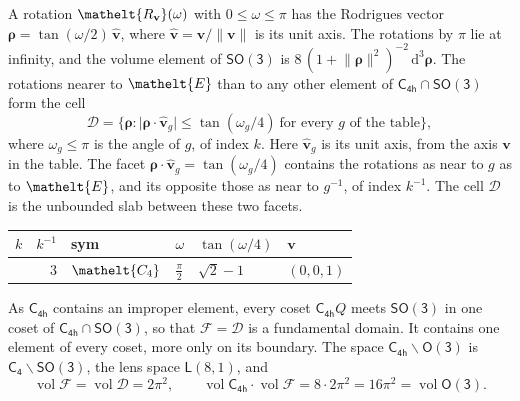 \documentclass[10pt,a4paper]{article}
\numberwithin{equation}{section}
\newcommand{\eltfont}[1]{{\let\sigma\eltsigma\mathelt{#1}}}
\newcommand{\grp}[1]{\mathsf{#1}}
\newcommand{\cls}[1]{\eltfont{#1}}
\newcommand{\elt}[1]{\eltfont{#1}}
\newcommand{\dirvec}[3]{(#1, #2, #3)}
\newcommand{\unitaxis}{\hat{\mathbf{v}}}
\newcommand{\vv}{\mathbf{v}}
\newcommand{\diff}{\mathrm{d}}
\newcommand{\vol}{\operatorname{vol}}
\newcommand{\rodrigues}{\boldsymbol{\rho}}
\newcommand{\fcell}{\mathcal{D}}
\newcommand{\fdomain}{\mathcal{F}}
\newcommand{\lensspace}[2]{\mathsf{L}(#1, #2)}
\begin{document}
\leavevmode\label{n:vector.rodrigues}\label{n:vector.unitaxis}A rotation $\elt{R_{\vv}}(\omega)$ with $0 \le \omega \le \pi$ has the Rodrigues vector $\rodrigues = \tan(\omega/2)\,\unitaxis$, where $\unitaxis = \vv/\lVert\vv\rVert$ is its unit axis. The rotations by $\pi$ lie at infinity, and the volume element of \href{SO3.pdf}{$\grp{SO(3)}$} is $8\,(1 + \lVert\rodrigues\rVert^2)^{-2}\,\diff^3\rodrigues$.
\leavevmode\label{n:set.cell}The rotations nearer to $\elt{E}$ than to any other element of $\grp{C_{4h}} \cap \grp{SO(3)}$ form the cell
\begin{equation}\label{e:cell}\fcell = \bigl\{\rodrigues : \lvert\rodrigues\cdot\unitaxis_g\rvert \le \tan(\omega_g/4)\ \text{for every $g$ of the table}\bigr\},\end{equation}
where $\omega_g \le \pi$ is the angle of $g$, of index $k$. Here $\unitaxis_g$ is its unit axis, from the axis $\vv$ in the table. The facet $\rodrigues\cdot\unitaxis_g = \tan(\omega_g/4)$ contains the rotations as near to $g$ as to $\elt{E}$, and its opposite those as near to $g^{-1}$, of index $k^{-1}$. The cell $\fcell$ is the unbounded slab between these two facets.
{\small{\renewcommand{\arraystretch}{1.3}\begin{longtable}{@{}rrllll@{}}\toprule
$k$ & $k^{-1}$ & sym & $\omega$ & $\tan(\omega/4)$ & $\vv$\\\midrule\endhead
\bottomrule\endfoot\endlastfoot
1 & 3 & $\cls{C_{4}}$ & $\tfrac{\pi}{2}$ & $\sqrt{2} - 1$ & $\dirvec{0}{0}{1}$\\
\bottomrule\end{longtable}}}

\leavevmode\label{n:set.fundamental}As $\grp{C_{4h}}$ contains an improper element, every coset $\grp{C_{4h}}Q$ meets \href{SO3.pdf}{$\grp{SO(3)}$} in one coset of $\grp{C_{4h}} \cap \grp{SO(3)}$, so that $\fdomain = \fcell$ is a fundamental domain. It contains one element of every coset, more only on its boundary.
\leavevmode\label{n:set.lens}The space $\grp{C_{4h}}\backslash\grp{O(3)}$ is $\grp{C_{4}}\backslash\grp{SO(3)}$, the lens space $\lensspace{8}{1}$, and
\begin{equation}\label{e:volume}\vol\fdomain = \vol\fcell = 2\pi^2,\qquad \vol\grp{C_{4h}}\cdot\vol\fdomain = 8\cdot 2\pi^2 = 16\pi^2 = \vol\grp{O(3)}.\end{equation}
\end{document}

